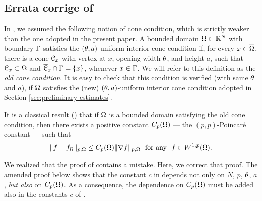 \documentclass[a4paper,10pt]{amsart}
\numberwithin{equation}{section}
\begin{document}
\subsection{Errata corrige of \texorpdfstring{\cite[Corollary 2.3 and Theorems 2.4 and 2.7]{MP6}}{[17, Corollary 2.3 and Theorems 2.4 and 2.7]}}
\label{sec:errata corrige}
In \cite{MP6}, we assumed the following notion of cone condition, which is strictly weaker than the one adopted in the present paper. A bounded domain $\Omega \subset \mathbb{R}^N$ with boundary $\Gamma$ satisfies the $(\theta, a)$-uniform interior cone condition if, for every $x \in \overline{\Omega}$, there is a cone $\mathcal{C}_x$ with vertex at $x$, opening width $\theta$, and height $a$, such that
$\mathcal{C}_{x} \subset\Omega$ and  $\overline{\mathcal{C}}_{x} \cap \Gamma = \{ x \} $, whenever $x \in \Gamma$.
We will refer to this definition as the \textit{old cone condition}. It is easy to check that this condition is verified (with same $\theta$ and $a$), if $\Omega$ satisfies the (new) $(\theta,a)$-uniform interior cone condition adopted in Section \ref{sec:preliminary-estimates}.

It is a classical result (\cite{Ad, Ru}) that if $\Omega$ is a bounded domain satisfying the old cone condition, then there exists a positive constant $C_p(\Omega)$ ---  the $(p,p)$-Poincar\'e constant --- such that 
\begin{equation*}\label{eq:errata corrige pp Poincare}
	\Vert f - f_\Omega\Vert_{p,\Omega}\le C_p(\Omega) \Vert\nabla f\Vert_{p,\Omega} \ \text{ for any } \ f \in W^{1,p}(\Omega).
\end{equation*}


\par
We realized that the proof of \cite[Corollary 2.3]{MP6} contains a mistake.
Here, we correct that proof. 
The amended proof below shows that the constant $c$ in \cite[Corollary 2.3]{MP6} depends not only on $N$, $p$, $\theta$, $a$, \textit{but also} on $C_p(\Omega)$. As a consequence, the dependence on $C_p(\Omega)$ must be added also in the constants $c$ of \cite[Theorems 2.4 and 2.7]{MP6}.
\end{document}
